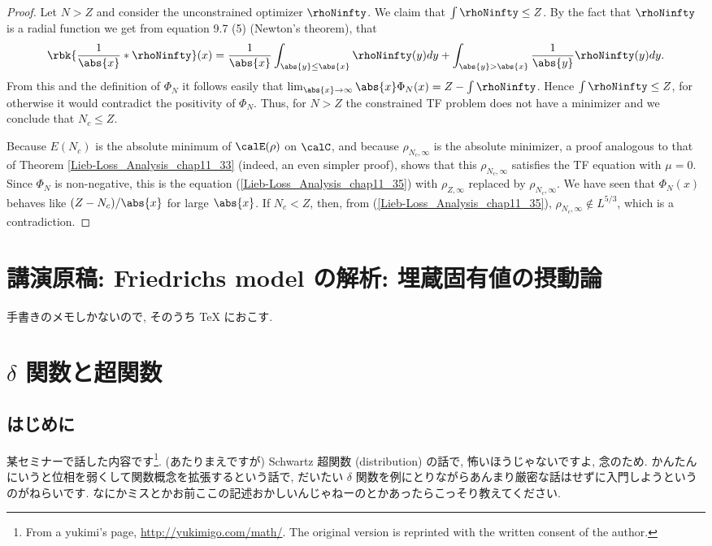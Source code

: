 \documentclass[openany, a4paper, oneside]{jsbook}
\begin{document}
\begin{proof}
Let $N > Z$ and consider the unconstrained optimizer $\rhoNinfty$.
We claim that $\int \rhoNinfty \leq Z$.
By the fact that $\rhoNinfty$ is a radial function we get from equation 9.7 (5) \cite{LiebLoss1} (Newton's theorem),
that
\begin{align}
 \rbk{\frac{1}{\abs{x}} * \rhoNinfty} (x)
 =
 \frac{1}{\abs{x}} \int_{\abs{y} \leq \abs{x}} \rhoNinfty (y) dy
  +\int_{\abs{y} > \abs{x}} \frac{1}{\abs{y}} \rhoNinfty (y) dy.
\end{align}
From this and the definition of $\Phi_N$ it follows easily that $\lim_{\abs{x} \to \infty} \abs{x} \Phi_N (x) = Z - \int \rhoNinfty$.
Hence $\int \rhoNinfty \leq Z$, for otherwise it would contradict the positivity of $\Phi_N$.
Thus, for $N > Z$ the constrained TF problem does not have a minimizer and we conclude that $N_c \leq Z$.

Because $E (N_c)$ is the absolute minimum of $\calE (\rho)$ on $\calC$,
and because $\rho_{N_c, \infty}$ is the absolute minimizer, a proof analogous to that of Theorem \ref{Lieb-Loss_Analysis_chap11_33}
(indeed, an even simpler proof), shows that this $\rho_{N_c, \infty}$ satisfies the TF equation with $\mu = 0$.
Since $\Phi_N$ is non-negative, this is the equation (\ref{Lieb-Loss_Analysis_chap11_35}) with $\rho_{Z, \infty}$ replaced by $\rho_{N_c, \infty}$.
We have seen that $\Phi_N (x)$ behaves like $(Z - N_c)/ \abs{x}$ for large $\abs{x}$.
If $N_c < Z$, then, from (\ref{Lieb-Loss_Analysis_chap11_35}), $\rho_{N_c, \infty} \notin L^{5/3}$, which is a contradiction.
\end{proof}
\chapter{講演原稿: Friedrichs model の解析: 埋蔵固有値の摂動論}

手書きのメモしかないので, そのうち \TeX{} におこす.
\chapter{$\delta$ 関数と超関数}

\section{はじめに}

某セミナーで話した内容です\footnote{From a yukimi's page, \url{http://yukimigo.com/math/}.
The original version is reprinted with the written consent of the author.}.
(あたりまえですが) Schwartz 超関数 (distribution) の話で, 怖いほうじゃないですよ, 念のため.
かんたんにいうと位相を弱くして関数概念を拡張するという話で,
だいたい $\delta$ 関数を例にとりながらあんまり厳密な話はせずに入門しようというのがねらいです.
なにかミスとかお前ここの記述おかしいんじゃねーのとかあったらこっそり教えてください.
\end{document}
